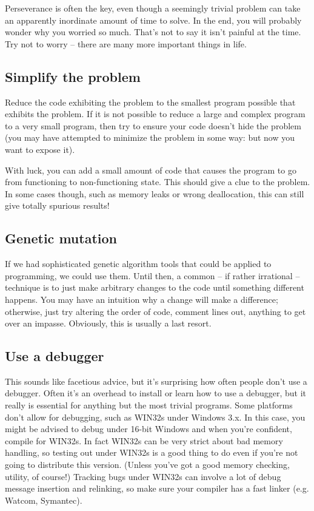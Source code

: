 Perseverance is often the key, even though a seemingly trivial problem
can take an apparently inordinate amount of time to solve. In the end,
you will probably wonder why you worried so much. That's not to say it
isn't painful at the time. Try not to worry -- there are many more important
things in life.

\subsection{Simplify the problem}

Reduce the code exhibiting the problem to the smallest program possible
that exhibits the problem. If it is not possible to reduce a large and
complex program to a very small program, then try to ensure your code
doesn't hide the problem (you may have attempted to minimize the problem
in some way: but now you want to expose it).

With luck, you can add a small amount of code that causes the program
to go from functioning to non-functioning state. This should give a clue
to the problem. In some cases though, such as memory leaks or wrong
deallocation, this can still give totally spurious results!

\subsection{Genetic mutation}

If we had sophisticated genetic algorithm tools that could be applied
to programming, we could use them. Until then, a common -- if rather irrational --
technique is to just make arbitrary changes to the code until something
different happens. You may have an intuition why a change will make a difference;
otherwise, just try altering the order of code, comment lines out, anything
to get over an impasse. Obviously, this is usually a last resort.

\subsection{Use a debugger}

This sounds like facetious advice, but it's surprising how often people
don't use a debugger. Often it's an overhead to install or learn how to
use a debugger, but it really is essential for anything but the most
trivial programs. Some platforms don't allow for debugging, such
as WIN32s under Windows 3.x. In this case, you might be advised to
debug under 16-bit Windows and when you're confident, compile for
WIN32s. In fact WIN32s can be very strict about bad memory handling,
so testing out under WIN32s is a good thing to do even if you're
not going to distribute this version. (Unless you've got a good memory checking,
utility, of course!) Tracking bugs under WIN32s can involve a lot of debug message
insertion and relinking, so make sure your compiler has a fast linker
(e.g. Watcom, Symantec).

